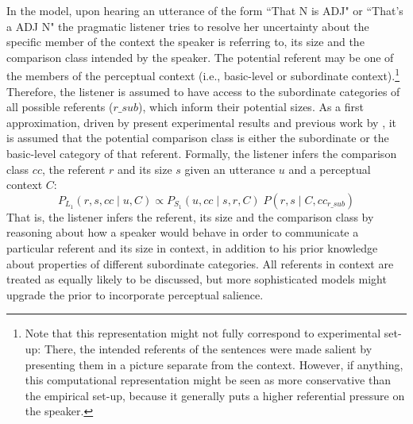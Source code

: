 In the model, upon hearing an utterance of the form ``That N is ADJ" or ``That's a ADJ N" the pragmatic listener tries to resolve her uncertainty about the specific member of the context the speaker is referring to, its size and the comparison class intended by the speaker. The potential referent may be one of the members of the perceptual context (i.e., basic-level or subordinate context).\footnote{Note that this representation might not fully correspond to experimental set-up: There, the intended referents of the sentences were made salient by presenting them in a picture separate from the context. However, if anything, this computational representation might be seen as more conservative than the empirical set-up, because it generally puts a higher referential pressure on the speaker.} Therefore, the listener is assumed to have access to the subordinate categories of all possible referents ($r\_{sub}$), which inform their potential sizes. As a first approximation, driven by present experimental results and previous work by \textcite{tessler2017warm}, it is assumed that the potential comparison class is either the subordinate or the basic-level category of that referent. 
Formally, the listener infers the comparison class $cc$, the referent $r$ and its size $s$ given an utterance $u$ and a perceptual context $C$:
\begin{equation}
P_{L_1} (r, s, cc \mid u, C) \propto P_{S_1} (u, cc \mid s, r, C) \; P(r, s \mid C, cc_{r\_sub}) 
\end{equation}
That is, the listener infers the referent, its size and the comparison class by reasoning about how a speaker would behave in order to communicate a particular referent and its size in context, in addition to his prior knowledge about properties of different subordinate categories. All referents in context are treated as equally likely to be discussed, but more sophisticated models might upgrade the prior to incorporate perceptual salience. 


